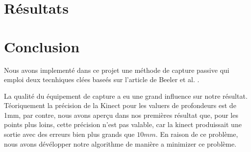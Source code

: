 \documentclass[a4paper,12pt]{article}
\begin{document}
\section{Résultats}

\section{Conclusion}

Nous avons implementé dans ce projet une méthode de capture 
passive qui emploi deux tecnhiques clées baseés sur l'article de Beeler et
al. \cite{Beeler:2011:HPF:2010324.1964970,}.

% 
% 


La qualité du équipement de capture a eu une grand influence sur notre
résultat. Téoriquement la précision de la Kinect pour les valuers de
profondeurs est de 1mm, par contre, nous avons aperçu dans nos
premières résultat que, pour les points plus loins, cette
précision n'est pas valable, car la kinect produissait une sortie avec
des erreurs bien plus grands que $10 mm$. 
En raison de ce problème, nous avons dévélopper notre algorithme de
manière a minimizer ce problème.
\end{document}
